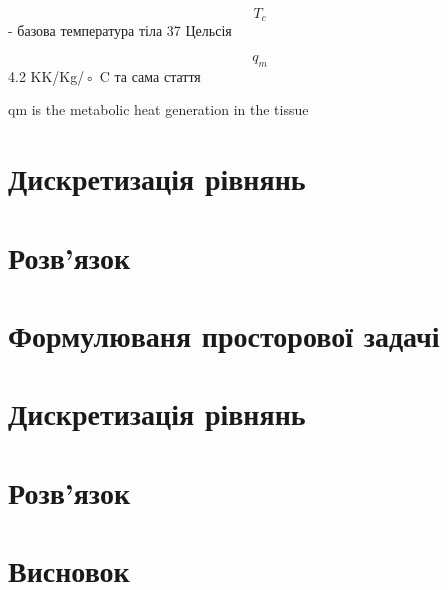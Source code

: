 $$T_c$$ - базова температура тіла 37 Цельсія

$$q_m$$ 4.2 KK/Kg/◦ C та сама стаття

qm is the metabolic heat generation in the tissue


\section{Дискретизація рівнянь}

\section{Розв'язок}

\section{Формулюваня просторової задачі}

\section{Дискретизація рівнянь}

\section{Розв'язок}

\section{Висновок}
